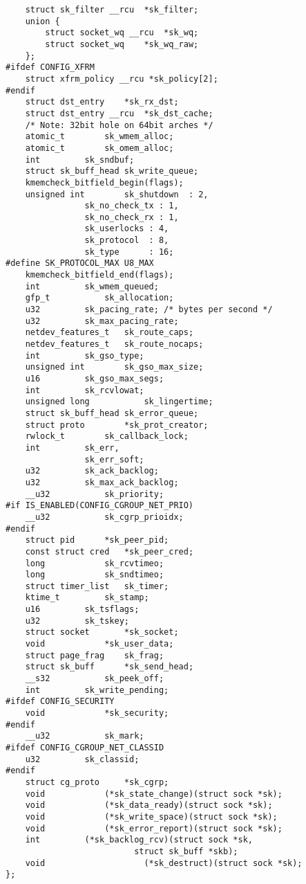 \begin{verbatim}
    struct sk_filter __rcu  *sk_filter;
    union {
        struct socket_wq __rcu  *sk_wq;
        struct socket_wq    *sk_wq_raw;
    };
#ifdef CONFIG_XFRM
    struct xfrm_policy __rcu *sk_policy[2];
#endif
    struct dst_entry    *sk_rx_dst;
    struct dst_entry __rcu  *sk_dst_cache;
    /* Note: 32bit hole on 64bit arches */
    atomic_t        sk_wmem_alloc;
    atomic_t        sk_omem_alloc;
    int         sk_sndbuf;
    struct sk_buff_head sk_write_queue;
    kmemcheck_bitfield_begin(flags);
    unsigned int        sk_shutdown  : 2,
                sk_no_check_tx : 1,
                sk_no_check_rx : 1,
                sk_userlocks : 4,
                sk_protocol  : 8,
                sk_type      : 16;
#define SK_PROTOCOL_MAX U8_MAX
    kmemcheck_bitfield_end(flags);
    int         sk_wmem_queued;
    gfp_t           sk_allocation;
    u32         sk_pacing_rate; /* bytes per second */
    u32         sk_max_pacing_rate;
    netdev_features_t   sk_route_caps;
    netdev_features_t   sk_route_nocaps;
    int         sk_gso_type;
    unsigned int        sk_gso_max_size;
    u16         sk_gso_max_segs;
    int         sk_rcvlowat;
    unsigned long           sk_lingertime;
    struct sk_buff_head sk_error_queue;
    struct proto        *sk_prot_creator;
    rwlock_t        sk_callback_lock;
    int         sk_err,
                sk_err_soft;
    u32         sk_ack_backlog;
    u32         sk_max_ack_backlog;
    __u32           sk_priority;
#if IS_ENABLED(CONFIG_CGROUP_NET_PRIO)
    __u32           sk_cgrp_prioidx;
#endif
    struct pid      *sk_peer_pid;
    const struct cred   *sk_peer_cred;
    long            sk_rcvtimeo;
    long            sk_sndtimeo;
    struct timer_list   sk_timer;
    ktime_t         sk_stamp;
    u16         sk_tsflags;
    u32         sk_tskey;
    struct socket       *sk_socket;
    void            *sk_user_data;
    struct page_frag    sk_frag;
    struct sk_buff      *sk_send_head;
    __s32           sk_peek_off;
    int         sk_write_pending;
#ifdef CONFIG_SECURITY
    void            *sk_security;
#endif
    __u32           sk_mark;
#ifdef CONFIG_CGROUP_NET_CLASSID
    u32         sk_classid;
#endif
    struct cg_proto     *sk_cgrp;
    void            (*sk_state_change)(struct sock *sk);
    void            (*sk_data_ready)(struct sock *sk);
    void            (*sk_write_space)(struct sock *sk);
    void            (*sk_error_report)(struct sock *sk);
    int         (*sk_backlog_rcv)(struct sock *sk,
                          struct sk_buff *skb);
    void                    (*sk_destruct)(struct sock *sk);
};
\end{verbatim}
